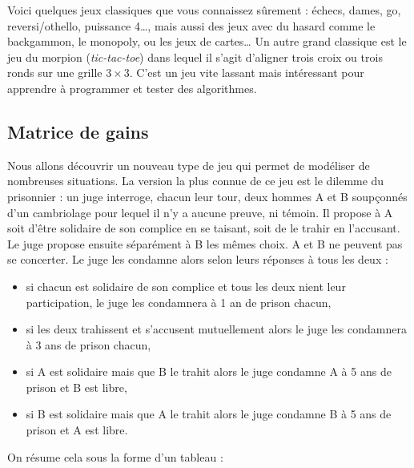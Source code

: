 \documentclass[11pt,class=report,crop=false]{standalone}
\begin{document}
\medskip

Voici quelques jeux classiques que vous connaissez sûrement : échecs, dames, go, reversi/othello, puissance 4\ldots, mais aussi des jeux avec du hasard comme le backgammon, le monopoly, ou les jeux de cartes\ldots{} 
Un autre grand classique est le jeu du morpion (\emph{tic-tac-toe}) dans lequel il s'agit d'aligner trois croix ou trois ronds sur une grille $3 \times 3$. C'est un jeu vite lassant mais intéressant pour apprendre à programmer et tester des algorithmes.

\begin{center}
\end{center}


\subsection{Matrice de gains}


Nous allons découvrir un nouveau type de jeu qui permet de modéliser de nombreuses situations.
La version la plus connue de ce jeu est le \og{}dilemme du prisonnier\fg{} : un juge interroge, chacun leur tour, deux hommes A et B soupçonnés d'un cambriolage pour lequel il n'y a aucune preuve, ni témoin.
Il propose à A soit d'être solidaire de son complice en se taisant, soit de le trahir en l'accusant. Le juge propose ensuite séparément à B les mêmes choix. A et B ne peuvent pas se concerter.
Le juge les condamne alors selon leurs réponses à tous les deux :
\begin{itemize}
	\item si chacun est solidaire de son complice et tous les deux nient leur participation, le juge les condamnera à 1 an de prison chacun,
	\item si les deux trahissent et s'accusent mutuellement alors le juge les condamnera à 3 ans de prison chacun,
	\item si A est solidaire mais que B le trahit alors le juge condamne A à 5 ans de prison et B est libre,
	\item si B est solidaire mais que A le trahit alors le juge condamne B à 5 ans de prison et A est libre.
\end{itemize}
On résume cela sous la forme d'un tableau :


\end{document}
